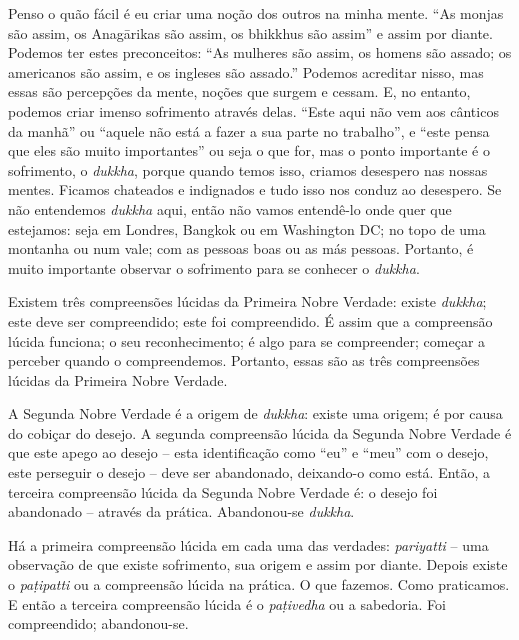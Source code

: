 Penso o quão fácil é eu criar uma noção dos outros na minha mente. ``As monjas
são assim, os Anagārikas são assim, os bhikkhus são assim'' e assim por diante.
Podemos ter estes preconceitos: ``As mulheres são assim, os homens são assado;
os americanos são assim, e os ingleses são assado.'' Podemos acreditar nisso,
mas essas são percepções da mente, noções que surgem e cessam. E, no entanto,
podemos criar imenso sofrimento através delas. ``Este aqui não vem aos cânticos
da manhã'' ou ``aquele não está a fazer a sua parte no trabalho'', e ``este
pensa que eles são muito importantes'' ou seja o que for, mas o ponto importante
é o sofrimento, o \emph{dukkha}, porque quando temos isso, criamos desespero nas
nossas mentes. Ficamos chateados e indignados e tudo isso nos conduz ao
desespero. Se não entendemos \emph{dukkha} aqui, então não vamos entendê-lo onde
quer que estejamos: seja em Londres, Bangkok ou em Washington DC; no topo de uma
montanha ou num vale; com as pessoas boas ou as más pessoas. Portanto, é muito
importante observar o sofrimento para se conhecer o \emph{dukkha}.

Existem três compreensões lúcidas da Primeira Nobre Verdade: existe
\emph{dukkha}; este deve ser compreendido; este foi compreendido. É assim que a
compreensão lúcida funciona; o seu reconhecimento; é algo para se compreender;
começar a perceber quando o compreendemos. Portanto, essas são as três
compreensões lúcidas da Primeira Nobre Verdade.

A Segunda Nobre Verdade é a origem de \emph{dukkha}: existe uma origem; é por
causa do cobiçar do desejo. A segunda compreensão lúcida da Segunda Nobre
Verdade é que este apego ao desejo -- esta identificação como ``eu'' e ``meu''
com o desejo, este perseguir o desejo -- deve ser abandonado, deixando-o como
está. Então, a terceira compreensão lúcida da Segunda Nobre Verdade é: o desejo
foi abandonado -- através da prática. Abandonou-se \emph{dukkha}.

Há a primeira compreensão lúcida em cada uma das verdades: \emph{pariyatti} --
uma observação de que existe sofrimento, sua origem e assim por diante. Depois
existe o \emph{paṭipatti} ou a compreensão lúcida na prática. O que fazemos.
Como praticamos. E então a terceira compreensão lúcida é o \emph{paṭivedha} ou a
sabedoria. Foi compreendido; abandonou-se.

